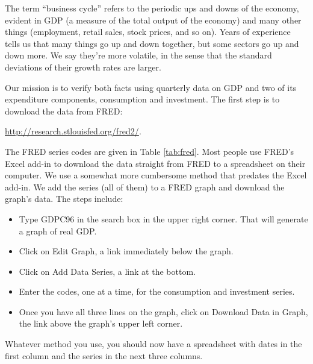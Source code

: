 \documentclass[12pt]{exam}
\begin{document}
\begin{questions}
\begin{solution}
\end{solution}


The term ``business cycle'' refers to the periodic ups and downs of the economy,
evident in GDP (a measure of the total output of the economy)
and many other things (employment, retail sales, stock prices, and so on).
Years of experience tells us that
many things go up and down together, but some sectors go up and down
more.
We say they're more volatile, in the sense that the standard deviations
of their growth rates are larger.

Our mission is to verify both facts using quarterly data on
GDP and two of its expenditure components, consumption and investment.
The first step is to download the data from FRED:

\vspace*{\parskip}
\centerline{\url{http://research.stlouisfed.org/fred2/}.}

The FRED series codes are given in Table \ref{tab:fred}.
Most people use FRED's Excel add-in to download the
data straight from FRED to a spreadsheet on their computer.
We use a somewhat more cumbersome method that predates the Excel add-in.
We add the series (all of them) to a FRED graph and download the graph's data.
The steps include:
\begin{itemize}
\item Type GDPC96 in the search box in the upper right corner.
That will generate a graph of real GDP.
\item Click on Edit Graph, a link immediately below the graph.
\item Click on Add Data Series, a link at the bottom.
\item Enter the codes, one at a time, for the consumption and investment series.
\item Once you have all three lines on the graph, click on
Download Data in Graph, the link above the graph's upper left corner.
\end{itemize}
Whatever method you use,
you should now have a spreadsheet with dates in the first column and the series in
the next three columns.


\end{questions}
\end{document}
